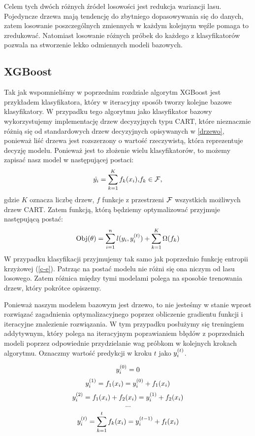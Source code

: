 \documentclass{book}
\begin{document}
	Celem tych dwóch różnych źródeł losowości jest redukcja wariancji lasu. Pojedyncze drzewa mają tendencję do zbytniego dopasowywania się do danych, zatem losowanie poszczególnych zmiennych w każdym kolejnym węźle pomaga to zredukować. Natomiast losowanie różnych próbek do każdego z klasyfikatorów pozwala na stworzenie lekko odmiennych modeli bazowych.

\subsection{XGBoost}
	Tak jak wspomnieliśmy w poprzednim rozdziale algorytm XGBoost jest przykładem klasyfikatora, który w iteracyjny sposób tworzy kolejne bazowe klasyfikatory. W przypadku tego algorytmu jako klasyfikator bazowy wykorzystujemy implementację drzew decyzyjnych typu CART, które nieznacznie różnią się od standardowych drzew decyzyjnych opisywanych w \ref{drzewo}, ponieważ liść drzewa jest rozszerzony o wartość rzeczywistą, która reprezentuje decyzję modelu. Ponieważ jest to złożenie wielu klasyfikatorów, to możemy zapisać nasz model w następującej postaci:
	$$ \hat{y_i} = \sum_{k=1}^K f_k(x_i) \text{,} f_k \in \mathcal{F} \text{,} $$
	gdzie $K$ oznacza liczbę drzew, $f$ funkcje z przestrzeni $\mathcal{F}$ wszystkich możliwych drzew CART.
	Zatem funkcją, którą będziemy optymalizować przyjmuje następującą postać:
	\begin{equation}
	\label{Obj}
		\text{Obj}(\theta) = \sum_{i=1}^{n} l(y_i, y_i^{(t)}) + \sum_{k=1}^{K} \Omega(f_k)
	\end{equation}
	W przypadku klasyfikacji przyjmujemy tak samo jak poprzednio funkcję entropii krzyżowej (\ref{c-e}).
	Patrząc na postać modelu nie różni się ona niczym od lasu losowego. Zatem różnica między tymi modelami polega na sposobie trenowania drzew, który pokrótce opiszemy.
	
	Ponieważ naszym modelem bazowym jest drzewo, to nie jesteśmy w stanie wprost rozwiązać zagadnienia optymalizacyjnego poprzez obliczenie gradientu funkcji i iteracyjne znalezienie rozwiązania. W tym przypadku posłużymy się treningiem addytywnym, który polega na iteracyjnym poprawianiem błędów z poprzednich modeli poprzez odpowiednie przydzielanie wag próbkom w kolejnych krokach algorytmu. 
	Oznaczmy wartość predykcji w kroku $t$ jako $y_i^{(t)}$.
	
	 $$ y_i^{(0)} = 0 $$
	 $$ y_i^{(1)} = f_1(x_i)  = y_i^{(0)} + f_1(x_i) $$
	 $$ y_i^{(2)} = f_1(x_i) + f_2(x_i) = y_i^{(1)} + f_2(x_i) $$
	 $$ ... $$
	 $$ y_i^{(t)} = \sum_{k=1}^{t} f_k(x_i) = y_i^{(t-1)} + f_t(x_i) $$
	 
\end{document}
